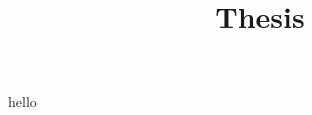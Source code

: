 \documentclass[a4paper, 12pt]{article}
\date{}
\title{Thesis}
\begin{document}
\maketitle

hello


\begin{code}%
\>[0]\AgdaSpace{}%
\AgdaSpace{}%
\<%
\end{code}
\end{document}
